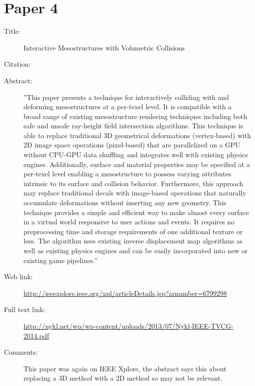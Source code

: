 \documentclass{scrartcl}
\begin{document}
\section*{Paper 4}
\begin{description}
	\item[Title:]Interactive Mesostructures with Volumetric Collisions	
	\item[Citation:] \cite{Nykl}
	\item[Abstract:] ''This paper presents a technique for interactively colliding with and deforming mesostructures at a per-texel level. It is compatible with a broad range of existing mesostructure rendering techniques including both safe and unsafe ray-height field intersection algorithms. This technique is able to replace traditional 3D geometrical deformations (vertex-based) with 2D image space operations (pixel-based) that are parallelized on a GPU without CPU-GPU data shuffling and integrates well with existing physics engines. Additionally, surface and material properties may be specified at a per-texel level enabling a mesostructure to possess varying attributes intrinsic to its surface and collision behavior. Furthermore, this approach may replace traditional decals with image-based operations that naturally accumulate deformations without inserting any new geometry. This technique provides a simple and efficient way to make almost every surface in a virtual world responsive to user actions and events. It requires no preprocessing time and storage requirements of one additional texture or less. The algorithm uses existing inverse displacement map algorithms as well as existing physics engines and can be easily incorporated into new or existing game pipelines.''
	\item[Web link:] \url{http://ieeexplore.ieee.org/xpl/articleDetails.jsp?arnumber=6799298}
	\item[Full text link:] \url{http://nykl.net/wp/wp-content/uploads/2013/07/Nykl-IEEE-TVCG-2014.pdf}
	\item[Comments:] This paper was again on IEEE Xplore, the abstract says this about replacing a 3D method with a 2D method so may not be relevant. 
\end{description}
\end{document}
